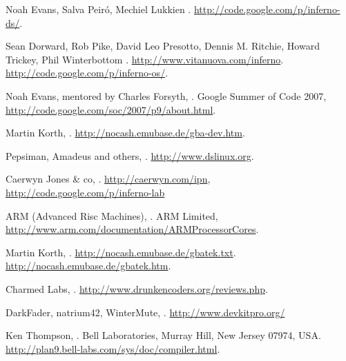 \documentclass[11pt]{p9article}
\newcommand{\hrefx}[1]{\href{#1}{#1}} %
\begin{document}
\begin{thebibliography}{1}

	Noah Evans, Salva Peiró, Mechiel Lukkien
	.
	\hrefx{http://code.google.com/p/inferno-ds/}.

	Sean Dorward, Rob Pike, David Leo Presotto, Dennis M. Ritchie, Howard Trickey, Phil Winterbottom
	.
	\hrefx{http://www.vitanuova.com/inferno}.
	\hrefx{http://code.google.com/p/inferno-os/}.

	Noah Evans, mentored by Charles Forsyth,
	.
	\newblock Google Summer of Code 2007,
	\newblock \hrefx{http://code.google.com/soc/2007/p9/about.html}.

	Martin Korth,
	.
	\hrefx{http://nocash.emubase.de/gba-dev.htm}.

	Pepsiman, Amadeus and others,
	.
	\hrefx{http://www.dslinux.org}.
	
	Caerwyn Jones \& co,
	.
	\newblock \hrefx{http://caerwyn.com/ipn}, \hrefx{http://code.google.com/p/inferno-lab}

	ARM (Advanced Risc Machines),
	.
	\newblock ARM Limited,
	\newblock \hrefx{http://www.arm.com/documentation/ARMProcessorCores}.
	
	Martin Korth,
	.
	\hrefx{http://nocash.emubase.de/gbatek.txt}.
	\hrefx{http://nocash.emubase.de/gbatek.htm}.

	Charmed Labs,
	.
	\hrefx{http://www.drunkencoders.org/reviews.php}.

	DarkFader, natrium42, WinterMute, 
	.
	\newblock \hrefx{http://www.devkitpro.org/}
	
	Ken Thompson,
	.
	\newblock Bell Laboratories, Murray Hill, New Jersey 07974, USA.
	\newblock \hrefx{http://plan9.bell-labs.com/sys/doc/compiler.html}.


\end{thebibliography}
\end{document}
